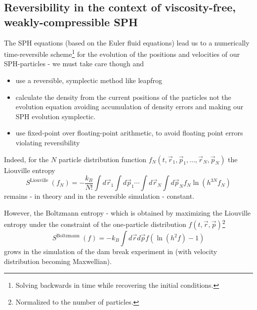 \subsection{Reversibility in the context of viscosity-free, weakly-compressible SPH\skipthis}


The SPH equations (based on the Euler fluid equations) lead us to a numerically time-reversible
scheme\footnote{Solving backwards in time while recovering the initial conditions.} for the evolution of the positions and velocities
of our SPH-particles - we must take care though and
\begin{itemize}
    \item use a reversible, symplectic method like leapfrog
    \item calculate the density from the current positions of the particles not the evolution equation
    avoiding accumulation of density errors and making our SPH evolution symplectic.
    \item use fixed-point over floating-point arithmetic, to avoid floating point errors violating reversibility
\end{itemize}


Indeed, for the $N$ particle distribution function $f_N(t,\vec{r}_1,\vec{p}_1,\dots,\vec{r}_N,\vec{p}_N)$
the Liouville entropy
\begin{equation}
    S^{\text {Liouville }}\left(f_N\right)=-\frac{k_B}{N !} \int d \vec{r}_1 \int d \vec{p}_1 \cdots \int d \vec{r}_N \int d \vec{p}_N f_N \ln \left(h^{3 N} f_N\right)
\end{equation}
remains - in theory and in the reversible simulation \citep{Kincl23} - constant.

However, the Boltzmann entropy - which is obtained by maximizing the Liouville
entropy under the constraint of the one-particle distribution $f(t,\vec{r},\vec{p})$\footnote{Normalized to the number of particles.}
\begin{equation}
    S^{\text {Boltzmann }}(f)=-k_B \int d \vec{r} d \vec{p} f\left(\ln \left(h^2 f\right)-1\right)
\end{equation}
grows in the simulation of the dam break experiment in \cite{Kincl23} (with velocity distribution becoming Maxwellian).

